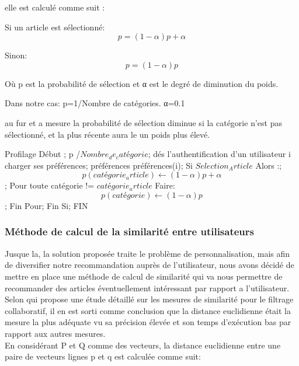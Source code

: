 elle est calculé comme suit : 

Si un article est sélectionné:
                                   \[p = (1-{\alpha}) {p} + {\alpha}\]

Sinon: 
                                     \[{p} = (1-{\alpha}) {p}\]

Où p est la probabilité de sélection et α est le degré de diminution du poids.

Dans notre cas:
                                   p=1/Nombre de catégories.
                                   α=0.1

au fur et a mesure la probabilité de sélection diminue si la catégorie n'est pas sélectionné, et la plus récente aura le un poids plus élevé. 

 \begin{algorithm}
    
    \begin{algorithmic}[1]
        \STATE Profilage
        \STATE Début
        \STATE \alpha {};
        \STATE p /$Nombre_de_catégorie$;     
        \STATE dés l'authentification d'un utilisateur i charger ses préférences;
        \STATE préférences \gets préférences(i);    
        \STATE Si $Selection_Article$ Alors :;
        \STATE \[p(catégorie_article) \gets (1-{\alpha}) {p} + {\alpha}\];
        \STATE Pour toute catégorie != $catégorie_article$ Faire:
        \STATE \[p(catégorie) \gets (1-{\alpha}) {p} \] ;
        \STATE Fin Pour;
        \STATE Fin Si;  
        \STATE FIN
\end{algorithmic}
        
\end{algorithm}


\subsubsection{Méthode de calcul de la similarité entre utilisateurs}
Jusque la, la solution proposée traite le problème de personnalisation, mais afin de diversifier notre recommandation auprès de l'utilisateur, nous avons décidé de mettre en place une méthode de calcul de similarité qui va nous permettre de recommander des articles éventuellement intéressant par rapport a l'utilisateur. Selon \cite{collaborativeapachemahout} qui propose une étude détaillé sur les mesures de similarité pour le filtrage collaboratif, il en est sorti comme conclusion que la distance euclidienne était la mesure la plus adéquate vu sa précision élevée et son temps d'exécution bas par rapport aux autres mesures.\\
En considérant P et Q comme des vecteurs, la distance euclidienne entre une paire de vecteurs lignes p et q est calculée comme suit:

